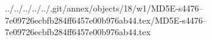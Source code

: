 ../../../../../.git/annex/objects/18/w1/MD5E-s4476--7e09726ecbfb284ff6457e00b976ab44.tex/MD5E-s4476--7e09726ecbfb284ff6457e00b976ab44.tex
